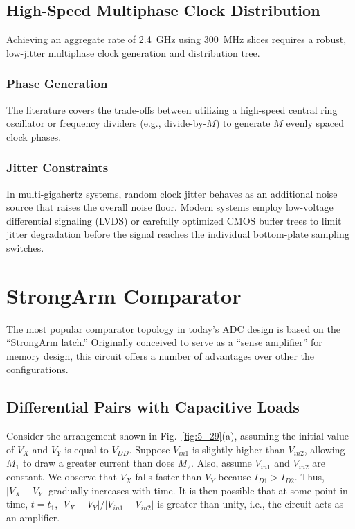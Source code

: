 \subsection{High-Speed Multiphase Clock Distribution}

Achieving an aggregate rate of \SI{2.4}{GHz} using \SI{300}{MHz} slices requires a robust,
low-jitter multiphase clock generation and distribution tree.

\subsubsection{Phase Generation}

The literature covers the trade-offs between utilizing a high-speed central ring oscillator or
frequency dividers (e.g., divide-by-$M$) to generate $M$ evenly spaced clock phases.

\subsubsection{Jitter Constraints}

In multi-gigahertz systems, random clock jitter behaves as an additional noise source that
raises the overall noise floor. Modern systems employ low-voltage differential signaling (LVDS)
or carefully optimized CMOS buffer trees to limit jitter degradation before the signal reaches
the individual bottom-plate sampling switches.

\section{StrongArm Comparator}
\label{sec:strongarm}
The most popular comparator topology in today’s ADC design is based on the “StrongArm latch.” Originally
conceived to serve as a “sense amplifier” for memory design, this circuit offers a number of advantages
over other the configurations.
\subsection{Differential Pairs with Capacitive Loads}

 Consider the arrangement
	shown in Fig.~\ref{fig:5_29}(a), assuming the initial value of $V_X$ and $V_Y$ is equal to
	$V_{DD}$. Suppose $V_{in1}$ is slightly higher than $V_{in2}$, allowing $M_1$ to
	draw a greater current than does $M_2$. Also, assume $V_{in1}$ and $V_{in2}$ are
	constant. We observe that $V_X$ falls faster than
	$V_Y$ because $I_{D1} > I_{D2}$. Thus, $|V_X - V_Y|$ gradually increases with time.
	It is then possible that at some point in time, $t = t_1$, $|V_X - V_Y|/|V_{in1} -
	V_{in2}|$ is greater than unity, i.e., the circuit acts as an amplifier.
	
